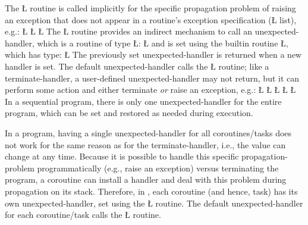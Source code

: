 \documentclass[openright,twoside]{report}
\begin{document}
The \LGinlinetrue\LGbegin\lgrinde\L{}\endlgrinde\LGend{} routine is called implicitly for the specific propagation problem of raising an exception that does not appear in a routine's exception specification (\LGinlinetrue\LGbegin\lgrinde\L{}\endlgrinde\LGend{} list), e.g.:
\LGinlinefalse\LGbegin\lgrinde
\L{}
\CE{}\L{\LB{}}
\CE{}\L{\LB{\}}}
\endlgrinde\LGend
The \LGinlinetrue\LGbegin\lgrinde\L{}\endlgrinde\LGend{} routine provides an indirect mechanism to call an unexpected-handler, which is a routine of type \LGinlinetrue\LGbegin\lgrinde\L{}\endlgrinde\LGend{}:
\LGinlinefalse\LGbegin\lgrinde
\L{}
\endlgrinde\LGend
and is set using the builtin routine \LGinlinetrue\LGbegin\lgrinde\L{}\endlgrinde\LGend{}, which has type:
\LGinlinefalse\LGbegin\lgrinde
\L{}
\endlgrinde\LGend
The previously set unexpected-handler is returned when a new handler is set.
The default unexpected-handler calls the \LGinlinetrue\LGbegin\lgrinde\L{}\endlgrinde\LGend{} routine;
like a terminate-handler, a user-defined unexpected-handler may not return, but it can perform some action and either terminate \emph{or} raise an exception, e.g.:
\LGinlinefalse\LGbegin\lgrinde
\L{}
\L{\LB{}}
\CE{}\L{\LB{}}
\CE{}\L{\LB{\}}}
\L{}
\endlgrinde\LGend
In a sequential program, there is only one unexpected-handler for the entire program, which can be set and restored as needed during execution.

In a \uC program, having a single unexpected-handler for all coroutines/tasks does not work for the same reason as for the terminate-handler, i.e., the value can change at any time.
Because it is possible to handle this specific propagation-problem programmatically (e.g., raise an exception) versus terminating the program, a coroutine can install a handler and deal with this problem during propagation on its stack.
Therefore, in \uC, each coroutine (and hence, task) has its own unexpected-handler, set using the \LGinlinetrue\LGbegin\lgrinde\L{}\endlgrinde\LGend{} routine.
The default unexpected-handler for each coroutine/task calls the \LGinlinetrue\LGbegin\lgrinde\L{}\endlgrinde\LGend{} routine.
\end{document}
